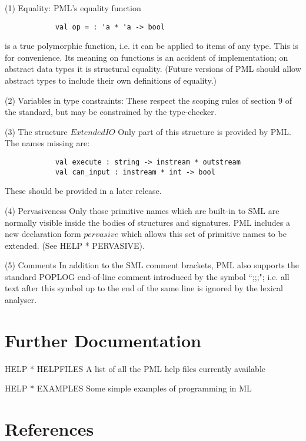     (1) Equality:                     
        PML's equality function
\begin{verbatim}
            val op = : 'a * 'a -> bool
\end{verbatim}

        is a true polymorphic function, i.e. it can be applied to items
        of any type. This is for convenience. Its meaning on functions
        is an accident of implementation; on abstract data types it is
        structural equality. (Future versions of PML should allow
        abstract types to include their own definitions of equality.)

    (2) Variables in type constraints:
        These respect the scoping rules of section 9 of the standard,
        but may be constrained by the type-checker.

    (3) The structure $ExtendedIO$
        Only part of this structure is provided by PML. The names
        missing are:
\begin{verbatim}
            val execute : string -> instream * outstream
            val can_input : instream * int -> bool
\end{verbatim}

        These should be provided in a later release.

    (4) Pervasiveness
        Only those primitive names which are built-in to SML are
        normally visible inside the bodies of structures and signatures.
        PML includes a new declaration form $pervasive$ which allows
        this set of primitive names to be extended.
        (See HELP * PERVASIVE).

    (5) Comments
        In addition to the SML comment brackets, PML also supports the
        standard POPLOG end-of-line comment introduced by the symbol
        ``;;;"; i.e. all text after this symbol up to the end of the same
        line is ignored by the lexical analyser.


\section{Further Documentation}

HELP * HELPFILES
    A list of all the PML help files currently available

HELP * EXAMPLES
    Some simple examples of programming in ML


\section{References}

